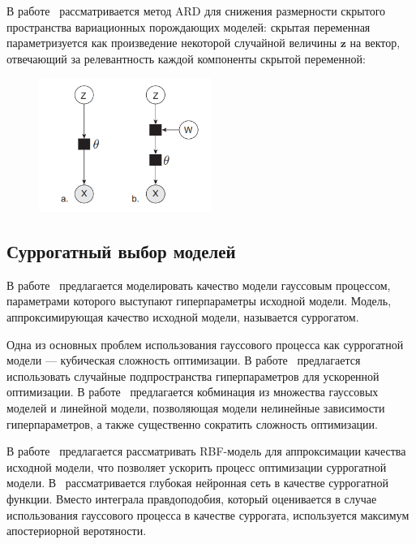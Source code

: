 В работе~\cite{ard} рассматривается метод ARD для снижения размерности скрытого пространства вариационных порождающих моделей: скрытая переменная параметризуется как  произведение некоторой случайной величины $\mathbf{z}$  на вектор, отвечающий за релевантность каждой компоненты скрытой переменной:
\begin{figure}[H]
\includegraphics[width=0.5\textwidth]{./plots/arch_review_figs/ard.png}
\end{figure}

\subsection{Суррогатный выбор моделей}
В работе~\cite{bo_gp} предлагается моделировать качество модели гауссовым процессом, параметрами которого выступают гиперпараметры исходной модели.
Модель, аппроксимирующая качество исходной модели, называется суррогатом. 

Одна из основных проблем использования гауссового процесса как суррогатной модели --- кубическая сложность оптимизации. В работе~\cite{random_gaus} предлагается использовать случайные подпространства гиперпараметров для ускоренной оптимизации.  В работе~\cite{gp_tree} предлагается кобминация из множества гауссовых моделей и линейной модели, позволяющая модели нелинейные зависимости гиперпараметров, а также существенно сократить сложность оптимизации. 

В работе~\cite{rbf_surrogate} предлагается рассматривать RBF-модель для аппроксимации качества исходной модели, что позволяет ускорить процесс оптимизации суррогатной модели. В~\cite{snoek_deep} рассматривается глубокая нейронная сеть в качестве суррогатной функции. Вместо интеграла правдоподобия, который оценивается в случае использования гауссового процесса в качестве суррогата, используется максимум апостериорной веротяности.

